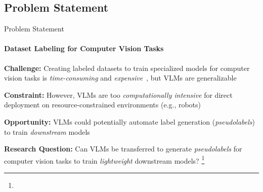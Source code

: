 \documentclass[aspectratio=169]{beamer}
\newcommand\blfootnote[1]{%
  \begingroup
  \renewcommand\thefootnote{}\footnote{#1}%
  \addtocounter{footnote}{-1}%
  \endgroup
}
\begin{document}
\subsection{Problem Statement}
\begin{frame}{Problem Statement}
\framesubtitle{Dataset Labeling for Computer Vision Tasks}
  \textbf{Challenge:} Creating labeled datasets to train specialized models for computer vision tasks is \emph{time-consuming} and \emph{expensive}~, but VLMs are generalizable
  \vspace{0.5em}

  \textbf{Constraint:} However, VLMs are too \emph{computationally intensive} for direct deployment on resource-constrained environments (e.g., robots)
  \vspace{0.5em}
    
  \textbf{Opportunity:} VLMs could potentially automate label generation (\emph{pseudolabels}) to train \emph{downstream} models
  \vspace{2em}

  \centering \textbf{Research Question:} Can VLMs be transferred to generate \emph{pseudolabels} for computer vision tasks to train \emph{lightweight} downstream models?
  \blfootnote{\vspace{0.05em}}
\end{frame}
\end{document}
